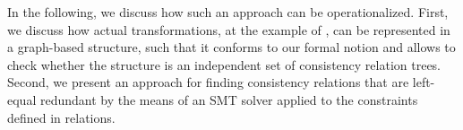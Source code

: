 In the following, we discuss how such an approach can be operationalized.
First, we discuss how actual transformations, at the example of \qvtr, can be represented in a graph-based structure, such that it conforms to our formal notion and allows to check whether the structure is an independent set of consistency relation trees.
Second, we present an approach for finding consistency relations that are left-equal redundant by the means of an SMT solver applied to the constraints defined in \qvtr relations.




